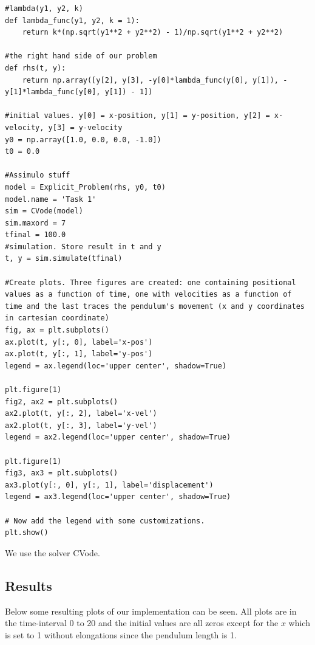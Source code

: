 \documentclass[a4paper,11pt]{article}
\theoremstyle{mytheor}
\begin{document}
\begin{lstlisting}[caption=Script for solving Task 1]
#lambda(y1, y2, k)
def lambda_func(y1, y2, k = 1):
    return k*(np.sqrt(y1**2 + y2**2) - 1)/np.sqrt(y1**2 + y2**2)

#the right hand side of our problem
def rhs(t, y):
    return np.array([y[2], y[3], -y[0]*lambda_func(y[0], y[1]), -y[1]*lambda_func(y[0], y[1]) - 1])

#initial values. y[0] = x-position, y[1] = y-position, y[2] = x-velocity, y[3] = y-velocity
y0 = np.array([1.0, 0.0, 0.0, -1.0])
t0 = 0.0

#Assimulo stuff
model = Explicit_Problem(rhs, y0, t0)
model.name = 'Task 1'
sim = CVode(model)
sim.maxord = 7
tfinal = 100.0
#simulation. Store result in t and y
t, y = sim.simulate(tfinal)

#Create plots. Three figures are created: one containing positional values as a function of time, one with velocities as a function of time and the last traces the pendulum's movement (x and y coordinates in cartesian coordinate)
fig, ax = plt.subplots()
ax.plot(t, y[:, 0], label='x-pos')
ax.plot(t, y[:, 1], label='y-pos')
legend = ax.legend(loc='upper center', shadow=True)

plt.figure(1)
fig2, ax2 = plt.subplots()
ax2.plot(t, y[:, 2], label='x-vel')
ax2.plot(t, y[:, 3], label='y-vel')
legend = ax2.legend(loc='upper center', shadow=True)

plt.figure(1)
fig3, ax3 = plt.subplots()
ax3.plot(y[:, 0], y[:, 1], label='displacement')
legend = ax3.legend(loc='upper center', shadow=True)

# Now add the legend with some customizations.
plt.show()
\end{lstlisting}

We use the solver CVode.

\subsection*{Results}
Below some resulting plots of our implementation can be seen. All plots are in the time-interval 0 to 20 and the initial values are all zeros except for the $x$ which is set to 1 without elongations since the pendulum length is 1.
\end{document}

